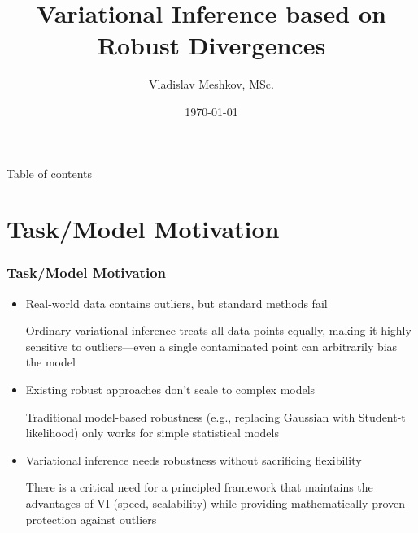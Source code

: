 \documentclass[aspectratio=169, 12pt]{beamer}
\title[\hbox to 56mm{Feature}]{Variational Inference based on Robust
Divergences}
\author[V.\,M.~Meshkov]{Vladislav Meshkov, MSc.}
\institute{Moscow Institute of Physics and Technology}
\date{\today}
\begin{document}
\maketitle

\begin{frame}{Table of contents}
    \tableofcontents
\end{frame}

\section{Task/Model Motivation}
\begin{frame}
\frametitle{Task/Model Motivation}
\begin{itemize}
\item Real-world data contains outliers, but standard methods fail

    Ordinary variational inference treats all data points equally, making it highly sensitive to outliers---even a single contaminated point can arbitrarily bias the model

\item Existing robust approaches don't scale to complex models

    Traditional model-based robustness (e.g., replacing Gaussian with Student-t likelihood) only works for simple statistical models

\item Variational inference needs robustness without sacrificing flexibility

    There is a critical need for a principled framework that maintains the advantages of VI (speed, scalability) while providing mathematically proven protection against outliers
\end{itemize}
\end{frame}

\end{document}
